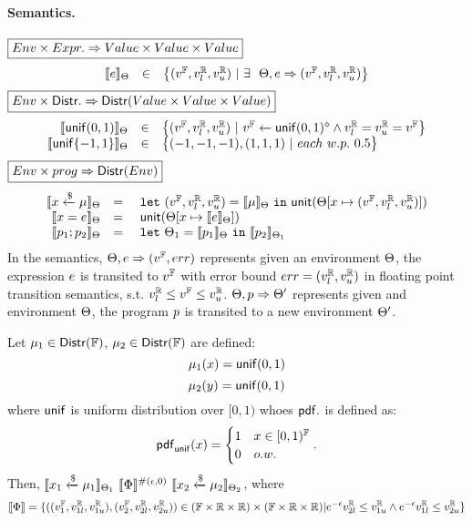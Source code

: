 \documentclass[a4paper,11pt]{article}
\begin{document}
\paragraph{Semantics.}
$\boxed{Env \times Expr. \Rightarrow Value \times Value \times Value }$
%
\[
	\begin{array}{rcl}
	\llbracket e \rrbracket_{\Theta}
	& \in &  
	\big\{(v^{\mathbb{F}}, v^{\mathbb{R}}_{l}, v^{\mathbb{R}}_{u}) ~|~
	\exists ~~  
	\Theta,  
	e \Rightarrow (v^{\mathbb{F}}, v^{\mathbb{R}}_{l}, v^{\mathbb{R}}_{u})\big\}
	\end{array}
\]
%
$
\boxed{Env \times \mathsf{Distr}. \Rightarrow 
\mathsf{Distr}(Value \times Value \times Value )}
$
%
\[
	\begin{array}{rcl}
	\llbracket \mathsf{unif}(0, 1) \rrbracket_{\Theta}
	& \in & 
	\big\{
	(v^{\mathbb{F}}, v^{\mathbb{R}}_{l}, v^{\mathbb{R}}_{u}) ~|~
	v^{\mathbb{F}} \leftarrow \mathsf{unif}(0, 1)^{\diamond}
	\land v^{\mathbb{R}}_{l} = v^{\mathbb{R}}_{u} = v^{\mathbb{F}}
	\big\}\\
	\llbracket \mathsf{unif}\{-1, 1\} \rrbracket_{\Theta}
	& \in & 
	\big\{
	(-1, -1, -1), (1, 1, 1) ~|~
	each ~ w.p. ~ 0.5 
	\big\}\\	
	\end{array}
\]
%
$\boxed{Env \times prog \Rightarrow \mathsf{Distr}(Env)}$
\[
\begin{array}{rcl}
	\llbracket x \xleftarrow{\$} \mu \rrbracket_{\Theta}
	& = & 
	~\mathtt{let}~ (v^{\mathbb{F}}, v^{\mathbb{R}}_{l}, v^{\mathbb{R}}_{u}) = \llbracket \mu \rrbracket_{\Theta}
	~\mathtt{in}~ 
	\mathsf{unit}(\Theta[x \mapsto (v^{\mathbb{F}}, v^{\mathbb{R}}_{l}, v^{\mathbb{R}}_{u})])
	\\
	\llbracket x = e \rrbracket_{\Theta}
	& = &  
	~\mathsf{unit}(\Theta[x \mapsto \llbracket e \rrbracket_{\Theta}])
	\\
	\llbracket p_1; p_2 \rrbracket_{\Theta}
	& = &  ~\mathtt{let}~  \Theta_1 = 
	\llbracket p_1 \rrbracket_{\Theta} ~\mathtt{in}~
	\llbracket p_2 \rrbracket_{\Theta_1} 
\end{array}
\]
%
In the semantics, 
%
$\Theta, e \Rightarrow (v^{\mathbb{F}}, err)$ represents given an environment
%
$\Theta$, the expression $e$
%
is transited to $v^{\mathbb{F}}$ with error bound $err = (v^{\mathbb{R}}_{l}, v^{\mathbb{R}}_{u})$
in floating point transition semantics,
%
s.t. $v^{\mathbb{R}}_{l} \leq v^{\mathbb{F}} \leq v^{\mathbb{R}}_{u}$.
%
$\Theta, p \Rightarrow \Theta'$ represents given and environment $\Theta$,
%
the program $p$ is transited to a new environment $\Theta'$.
%
%
%
\newpage
\begin{thm}
\label{thm:unif_coupling}
Let $\mu_1 \in \mathsf{Distr}(\mathbb{F})$, $\mu_2 \in \mathsf{Distr}(\mathbb{F})$ are defined:
\[
	\mu_1(x) = \mathsf{unif}(0, 1)
\]
\[
	\mu_2(y) = \mathsf{unif}(0, 1)
\]
where $\mathsf{unif}$ is uniform distribution over $[0, 1)$ whoes $\mathsf{pdf}.$ is defined as:
\[
	\mathsf{pdf}_{\mathsf{unif}}(x) = 
	\begin{cases}
	1 & x \in [0, 1)^{\mathbb{F}}\\
	0       & o.w.
	\end{cases}.
\]
Then, $	\llbracket x_1 \xleftarrow{\$} \mu_1 \rrbracket_{\Theta_1} 
		~ \llbracket \Phi \rrbracket^{\#(\epsilon, 0)} ~
		\llbracket x_2 \xleftarrow{\$} \mu_2 \rrbracket_{\Theta_2}$, 
where
\[
	\llbracket \Phi \rrbracket = 
	\{((v^{\mathbb{F}}_1, v^{\mathbb{R}}_{1l}, v^{\mathbb{R}}_{1u}), (v^{\mathbb{F}}_2, v^{\mathbb{R}}_{2l}, v^{\mathbb{R}}_{2u})) 
	\in (\mathbb{F} \times \mathbb{R} \times \mathbb{R}) \times (\mathbb{F} \times \mathbb{R} \times \mathbb{R})
	|
	e^{-\epsilon} v^{\mathbb{R}}_{2l} \leq v^{\mathbb{R}}_{1u}
	\land
	e^{-\epsilon} v^{\mathbb{R}}_{1l} \leq v^{\mathbb{R}}_{2u}
	\}
\]
\end{thm}
\end{document}
